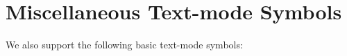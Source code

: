 \begin{demotable}
\end{demotable}

\section{Miscellaneous Text-mode Symbols}

We also support the following basic text-mode symbols:

\begin{demotable}
\demo{\ae}
\demo{\oe}
\demo{\dag}
\demo{\pounds}
\end{demotable}


